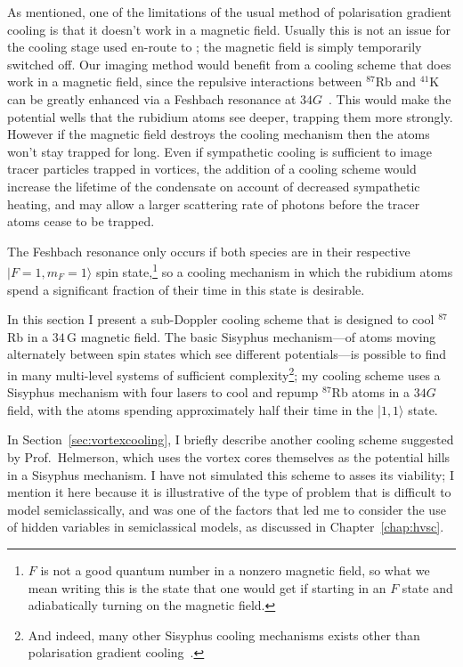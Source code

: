 As mentioned, one of the limitations of the usual method of polarisation gradient cooling is that it doesn't work in a magnetic field. Usually this is not an issue for the cooling stage used en-route to \bec; the magnetic field is simply temporarily switched off. Our imaging method would benefit from a cooling scheme that does work in a magnetic field, since the repulsive interactions between $^{87}$Rb and $^{41}$K can be greatly enhanced via a Feshbach resonance at $34 \unit{G}$~\cite{thalhammer_double_2008}. This would make the potential wells that the rubidium atoms see deeper, trapping them more strongly. However if the magnetic field destroys the cooling mechanism then the atoms won't stay trapped for long. Even if sympathetic cooling is sufficient to image tracer particles trapped in vortices, the addition of a cooling scheme would increase the lifetime of the condensate on account of decreased sympathetic heating, and may allow a larger scattering rate of photons before the tracer atoms cease to be trapped.

The Feshbach resonance only occurs if both species are in their respective \mbox{$|F=1,m_F=1\rangle$} spin state,\footnote{$F$ is not a good quantum number in a nonzero magnetic field, so what we mean writing this is the state that one would get if starting in an $F$ state and adiabatically turning on the magnetic field.} so a cooling mechanism in which the rubidium atoms spend a significant fraction of their time in this state is desirable.

In this section I present a sub-Doppler cooling scheme that is designed to cool $^{87}$Rb in a $34\,$G magnetic field. The basic Sisyphus mechanism---of atoms moving alternately between spin states which see different potentials---is possible to find in many multi-level systems of sufficient complexity\footnote{And indeed, many other Sisyphus cooling mechanisms exists other than polarisation gradient cooling~\cite[p 116]{metcalf_laser_1999}.}; my cooling scheme uses a Sisyphus mechanism with four lasers to cool and repump $^{87}$Rb atoms in a $34\unit{G}$ field, with the atoms spending approximately half their time in the \mbox{|$1,1\rangle$} state.

In Section~\ref{sec:vortexcooling}, I briefly describe another cooling scheme suggested by Prof.~Helmerson, which uses the vortex cores themselves as the potential hills in a Sisyphus mechanism. I have not simulated this scheme to asses its viability; I mention it here because it is illustrative of the type of problem that is difficult to model semiclassically, and was one of the factors that led me to consider the use of hidden variables in semiclassical models, as discussed in Chapter~\ref{chap:hvsc}.


